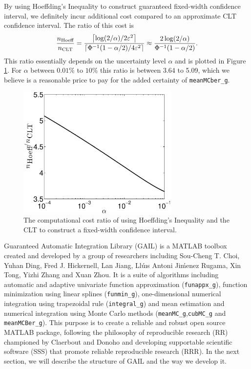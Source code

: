 \documentclass{iitthesis}
\theoremstyle{definition}
\begin{document}
By using Hoeffding's Inequality to construct guaranteed fixed-width confidence interval, we definitely incur additional cost compared to an approximate CLT confidence interval.  The ratio of this cost is 
\begin{equation}
\frac{n_{\text{Hoeff}}}{n_{\text{CLT}}} = \frac{\left \lceil \log(2/\alpha)/{2\varepsilon^2} \right \rceil}{\left \lceil{ \Phi^{-1}(1-\alpha/2)}/{4 \varepsilon^2}\right\rceil} \approx  \frac{2\log(2/\alpha)}{\Phi^{-1}(1-\alpha/2)}.
\end{equation}
This ratio essentially depends on the uncertainty level $\alpha$ and is plotted in Figure \ref{fig:ratiovsalpha}. For $\alpha$ between $0.01\%$ to $10\%$ this ratio is between 3.64 to 5.09, which we believe is a reasonable price to pay for the added certainty of {\tt meanMCber\_g}.

  \begin{figure}[htbp]
    \centering
    \includegraphics[width=8cm]{plotHoeffCLTr.eps} %
    \caption{The computational cost ratio of using Hoeffding's Inequality and the CLT to construct a fixed-width confidence interval.}
    \label{fig:ratiovsalpha}
 \end{figure}
 
 
Guaranteed Automatic Integration Library (GAIL) \cite{GAIL_2_1} is a MATLAB toolbox created and developed by a group of researchers including Sou-Cheng T. Choi, Yuhan Ding, Fred J. Hickernell, Lan Jiang, Ll\'{u}ıs Antoni Ji\'{m}enez Rugama, Xin Tong, Yizhi Zhang and Xuan Zhou. It is a suite of algorithms including automatic and adaptive univariate function approximation ({\tt funappx\_g}), function minimization using linear splines ({\tt funmin\_g}), one-dimensional numerical integration using trapezoidal rule ({\tt integral\_g}) and mean estimation and numerical integration using Monte Carlo methods ({\tt meanMC\_g},{\tt cubMC\_g} and {\tt meanMCBer\_g}). This purpose is to create a reliable and robust open source MATLAB package, following the philosophy of reproducible research (RR) championed by Claerbout \cite{Claerbout10} and Donoho\cite{BuckheitDonoho95} and developing supportable scientific software (SSS) that promote reliable reproducible research (RRR). In the next section, we will describe the structure of GAIL and the way we develop it.
\end{document}
